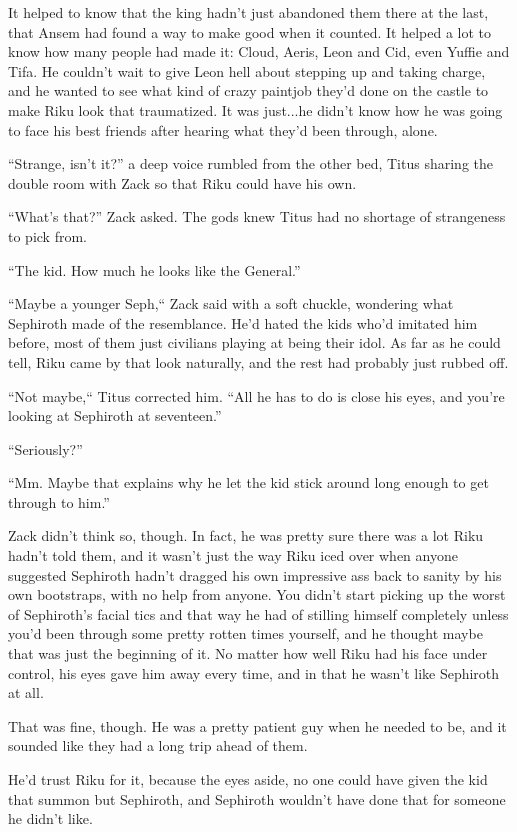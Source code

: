 It helped to know that the king hadn't just abandoned them there at the last, that Ansem had found a way to make good when it counted. It helped a lot to know how many people had made it: Cloud, Aeris, Leon and Cid, even Yuffie and Tifa. He couldn't wait to give Leon hell about stepping up and taking charge, and he wanted to see what kind of crazy paintjob they'd done on the castle to make Riku look that traumatized. It was just...he didn't know how he was going to face his best friends after hearing what they'd been through, alone.

``Strange, isn't it?'' a deep voice rumbled from the other bed, Titus sharing the double room with Zack so that Riku could have his own.

``What's that?'' Zack asked. The gods knew Titus had no shortage of strangeness to pick from.

``The kid. How much he looks like the General.''

``Maybe a younger Seph,`` Zack said with a soft chuckle, wondering what Sephiroth made of the resemblance. He'd hated the kids who'd imitated him before, most of them just civilians playing at being their idol. As far as he could tell, Riku came by that look naturally, and the rest had probably just rubbed off.

``Not maybe,`` Titus corrected him. ``All he has to do is close his eyes, and you're looking at Sephiroth at seventeen.''

``Seriously?''

``Mm. Maybe that explains why he let the kid stick around long enough to get through to him.''

Zack didn't think so, though. In fact, he was pretty sure there was a lot Riku hadn't told them, and it wasn't just the way Riku iced over when anyone suggested Sephiroth hadn't dragged his own impressive ass back to sanity by his own bootstraps, with no help from anyone. You didn't start picking up the worst of Sephiroth's facial tics and that way he had of stilling himself completely unless you'd been through some pretty rotten times yourself, and he thought maybe that was just the beginning of it. No matter how well Riku had his face under control, his eyes gave him away every time, and in that he wasn't like Sephiroth at all.

That was fine, though. He was a pretty patient guy when he needed to be, and it sounded like they had a long trip ahead of them.

He'd trust Riku for it, because the eyes aside, no one could have given the kid that summon but Sephiroth, and Sephiroth wouldn't have done that for someone he didn't like.


